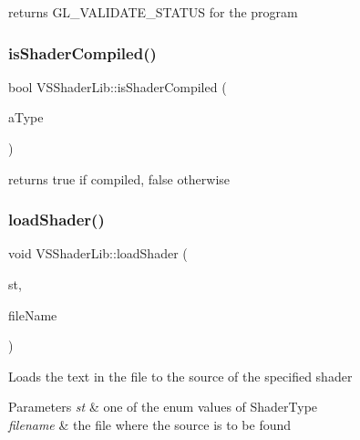 returns G\+L\+\_\+\+V\+A\+L\+I\+D\+A\+T\+E\+\_\+\+S\+T\+A\+T\+US for the program 

\mbox{\label{class_v_s_shader_lib_a734b05e49e117f678cdfeb6f34001c1c}} 
\subsubsection{\texorpdfstring{is\+Shader\+Compiled()}{isShaderCompiled()}}
{\footnotesize\ttfamily bool V\+S\+Shader\+Lib\+::is\+Shader\+Compiled (\begin{DoxyParamCaption}\item[{\hyperlink{class_v_s_shader_lib_ae8a4410569faa6d4df9760e998a9706a}{V\+S\+Shader\+Lib\+::\+Shader\+Type}}]{a\+Type }\end{DoxyParamCaption})}



returns true if compiled, false otherwise 

\mbox{\label{class_v_s_shader_lib_ab83a3a93954f8c8b02363e3975e306ef}} 
\subsubsection{\texorpdfstring{load\+Shader()}{loadShader()}}
{\footnotesize\ttfamily void V\+S\+Shader\+Lib\+::load\+Shader (\begin{DoxyParamCaption}\item[{\hyperlink{class_v_s_shader_lib_ae8a4410569faa6d4df9760e998a9706a}{V\+S\+Shader\+Lib\+::\+Shader\+Type}}]{st,  }\item[{std\+::string}]{file\+Name }\end{DoxyParamCaption})}

Loads the text in the file to the source of the specified shader


\begin{DoxyParams}{Parameters}
{\em st} & one of the enum values of Shader\+Type \\
\hline
{\em filename} & the file where the source is to be found \\
\hline
\end{DoxyParams}
\mbox{\label{class_v_s_shader_lib_ae08e31c02a625d9c1c82bd77797a62d7}} 
